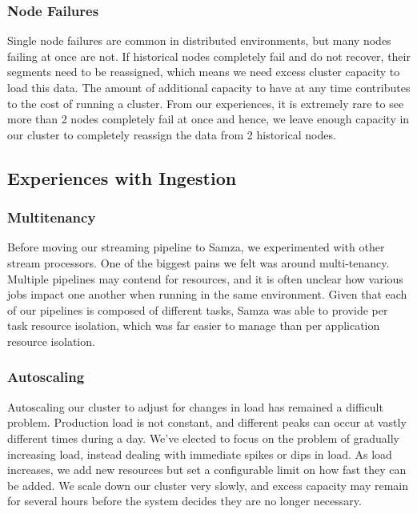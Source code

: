 \documentclass{vldb}
\begin{document}
\subsubsection{Node Failures}
Single node failures are common in distributed environments, but many nodes
failing at once are not. If historical nodes completely fail and do not
recover, their segments need to be reassigned, which means we need excess
cluster capacity to load this data. The amount of additional capacity to have
at any time contributes to the cost of running a cluster. From our experiences,
it is extremely rare to see more than 2 nodes completely fail at once and
hence, we leave enough capacity in our cluster to completely reassign the data
from 2 historical nodes. 

\subsection{Experiences with Ingestion}
\subsubsection{Multitenancy}
Before moving our streaming pipeline to Samza, we experimented with other
stream processors. One of the biggest pains we felt was around multi-tenancy. Multiple
pipelines may contend for resources, and it is often unclear how various jobs
impact one another when running in the same environment. Given that each of our
pipelines is composed of different tasks, Samza was able to provide per task
resource isolation, which was far easier to manage than per application
resource isolation.

\subsubsection{Autoscaling}
Autoscaling our cluster to adjust for changes in load has remained a difficult
problem. Production load is not constant, and different peaks can occur at
vastly different times during a day. We’ve elected to focus on the problem of
gradually increasing load, instead dealing with immediate spikes or dips in
load. As load increases, we add new resources but set a configurable limit on
how fast they can be added. We scale down our cluster very slowly, and excess
capacity may remain for several hours before the system decides they are no
longer necessary.
\end{document}
